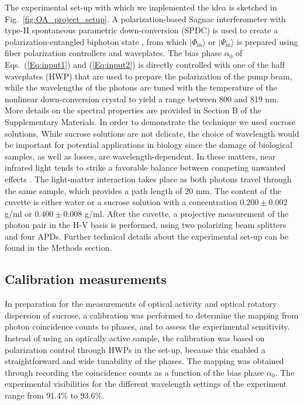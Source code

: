 \documentclass[12pt,preprint]{revtex4}
\begin{document}
The experimental set-up with which we implemented the idea is sketched in Fig.\ \ref{fig:OA_project_setup}. A polarization-based Sagnac interferometer with type-II spontaneous parametric down-conversion (SPDC) is used to create a polarization-entangled biphoton state \citep{Kim2006,Fedrizzi2007}, from which $|\Phi_{\mathrm{in}}\rangle$ or $|\Psi_{\mathrm{in}}\rangle$ is prepared using fiber polarization controllers and waveplates. The bias phase $\alpha_0$ of Eqs.\ (\ref{Eq:input1}) and (\ref{Eq:input2}) is directly controlled with one of the half waveplates (HWP) that are used to prepare the polarization of the pump beam, while the wavelengths of the photons are tuned with the temperature of the nonlinear down-conversion crystal to yield a range between 800 and 819 nm. More details on the spectral properties are provided in Section B of the Supplementary Materials. 
In order to demonstrate the technique we used sucrose solutions. While sucrose solutions are not delicate, the choice of wavelength would be important for potential applications in biology since the damage of biological samples, as well as losses, are wavelength-dependent. 
In these matters, near infrared light tends to strike a favorable balance between competing unwanted effects \citep{Taylor2014}. 
The light-matter interaction takes place as both photons travel through the same sample, which provides a path length of 20 mm. The content of the cuvette is either water or a sucrose solution with a concentration $0.200\pm 0.002$ g/ml or $0.400\pm0.008$ g/ml. 
After the cuvette, a projective measurement of the photon pair in the H-V basis is performed, using two polarizing beam splitters and four APDs. 
Further technical details about the experimental set-up can be found in the Methods section.

\subsection*{Calibration measurements}

In preparation for the measurements of optical activity and optical rotatory dispersion of sucrose, a calibration was performed to determine the mapping from photon coincidence counts to phases, and to assess the experimental sensitivity. Instead of using an optically active sample, the calibration was based on polarization control through HWPs in the set-up, because this enabled a straightforward and wide tunability of the phases. The mapping was obtained through recording the coincidence counts as a function of the bias phase $\alpha_0$. The experimental visibilities for the different wavelength settings of the experiment range from 91.4\% to 93.6\%. 
\end{document}
